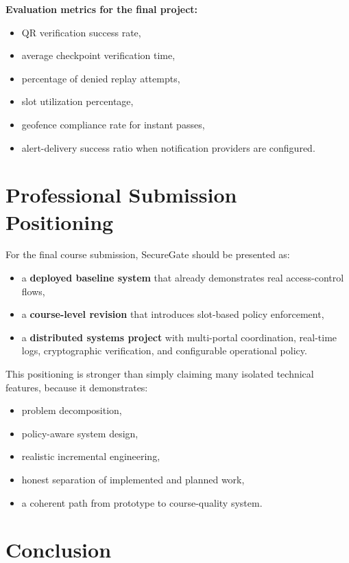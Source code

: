 \documentclass[12pt,letterpaper]{article}
\begin{document}
\textbf{Evaluation metrics for the final project:}
\begin{itemize}
    \item QR verification success rate,
    \item average checkpoint verification time,
    \item percentage of denied replay attempts,
    \item slot utilization percentage,
    \item geofence compliance rate for instant passes,
    \item alert-delivery success ratio when notification providers are configured.
\end{itemize}

\section{Professional Submission Positioning}

For the final course submission, SecureGate should be presented as:
\begin{itemize}
    \item a \textbf{deployed baseline system} that already demonstrates real access-control flows,
    \item a \textbf{course-level revision} that introduces slot-based policy enforcement,
    \item a \textbf{distributed systems project} with multi-portal coordination, real-time logs, cryptographic verification, and configurable operational policy.
\end{itemize}

This positioning is stronger than simply claiming many isolated technical features, because it demonstrates:
\begin{itemize}
    \item problem decomposition,
    \item policy-aware system design,
    \item realistic incremental engineering,
    \item honest separation of implemented and planned work,
    \item a coherent path from prototype to course-quality system.
\end{itemize}

\section{Conclusion}
\end{document}
